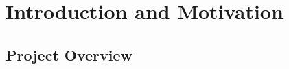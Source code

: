 \documentclass[ %
                author={Finn Alexander Wilkinson},
                supervisor={Dr. Andrew Calway},
                degree={MEng},
                title={\centering A Mixed Reality Aim Assistant for Pool and Snooker},
                subtitle={},
                type={Enterprise},
                year={2021} ]{dissertation}
\begin{document}

%

\mainmatter




\chapter{Introduction and Motivation}
\label{chap:intro}

\section{Project Overview}
 
\end{document}

